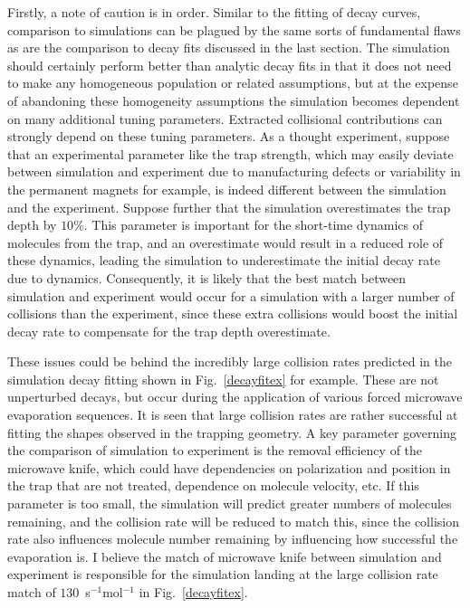 Firstly, a note of caution is in order.
Similar to the fitting of decay curves, comparison to simulations can be plagued by the same sorts of fundamental flaws as are the comparison to decay fits discussed in the last section.
The simulation should certainly perform better than analytic decay fits in that it does not need to make any homogeneous population or related assumptions, but at the expense of abandoning these homogeneity assumptions the simulation becomes dependent on many additional tuning parameters.
Extracted collisional contributions can strongly depend on these tuning parameters.
As a thought experiment, suppose that an experimental parameter like the trap strength, which may easily deviate between simulation and experiment due to manufacturing defects or variability in the permanent magnets for example, is indeed different between the simulation and the experiment. 
Suppose further that the simulation overestimates the trap depth by $10$\%.
This parameter is important for the short-time dynamics of molecules from the trap, and an overestimate would result in a reduced role of these dynamics, leading the simulation to underestimate the initial decay rate due to dynamics.
Consequently, it is likely that the best match between simulation and experiment would occur for a simulation with a larger number of collisions than the experiment, since these extra collisions would boost the initial decay rate to compensate for the trap depth overestimate.

These issues could be behind the incredibly large collision rates predicted in the simulation decay fitting shown in Fig.~\ref{decayfitex} for example.
These are not unperturbed decays, but occur during the application of various forced microwave evaporation sequences.
It is seen that large collision rates are rather successful at fitting the shapes observed in the trapping geometry.
A key parameter governing the comparison of simulation to experiment is the removal efficiency of the microwave knife, which could have dependencies on polarization and position in the trap that are not treated, dependence on molecule velocity, etc.
If this parameter is too small, the simulation will predict greater numbers of molecules remaining, and the collision rate will be reduced to match this, since the collision rate also influences molecule number remaining by influencing how successful the evaporation is.
I believe the match of microwave knife between simulation and experiment is responsible for the simulation landing at the large collision rate match of $130$~s$^{-1}$mol$^{-1}$ in Fig.~\ref{decayfitex}.


